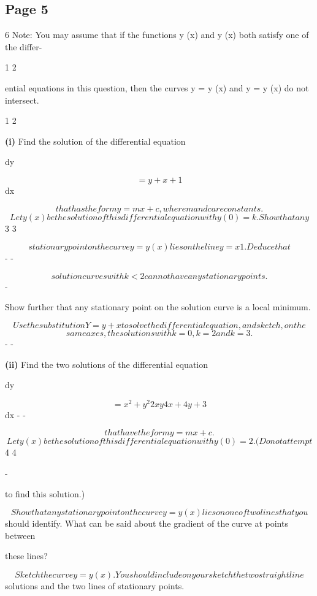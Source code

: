 \documentclass[12pt]{article}
\begin{document}
\subsection*{Page 5}
\begin{flushleft}
6 Note: You may assume that if the functions y (x) and y (x) both satisfy one of the differ-\par
1 2\par
ential equations in this question, then the curves y = y (x) and y = y (x) do not intersect.\par
1 2\par
\textbf{(i)} Find the solution of the differential equation\par
dy\par
\[= y + x + 1\]
dx\par
\[that has the form y = mx + c, where m and c are constants.\]
\[Let y (x) be the solution of this differential equation with y (0) = k. Show that any\]
3 3\par
\[stationary point on the curve y = y (x) lies on the line y = x 1. Deduce that\]
- -\par
\[solution curves with k < 2 cannot have any stationary points.\]
-\par
Show further that any stationary point on the solution curve is a local minimum.\par
\[Use the substitution Y = y + x to solve the differential equation, and sketch, on the\]
\[same axes, the solutions with k = 0, k = 2 and k = 3.\]
- -\par
\textbf{(ii)} Find the two solutions of the differential equation\par
dy\par
\[= x^2 + y^2 2xy 4x + 4y + 3\]
dx - -\par
\[that have the form y = mx + c.\]
\[Let y (x) be the solution of this differential equation with y (0) = 2. (Do not attempt\]
4 4\par
-\par
to find this solution.)\par
\[Show that any stationary point on the curve y = y (x) lies on one of two lines that you\]
should identify. What can be said about the gradient of the curve at points between\par
these lines?\par
\[Sketch the curve y = y (x). You should include on your sketch the two straight line\]
solutions and the two lines of stationary points.\par
\end{flushleft}
\end{document}
